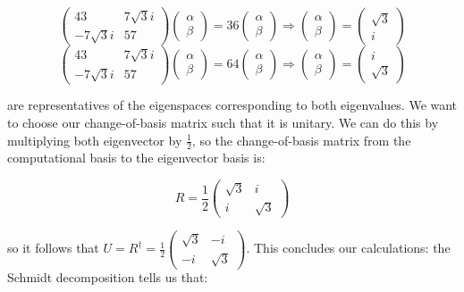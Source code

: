 \documentclass[
 10pt,
 amsmath,amssymb,
 notitlepage,
]{revtex4-1}
\begin{document}
$$ \begin{pmatrix} 43 & 7\sqrt{3}i \\ -7\sqrt{3}i & 57 \end{pmatrix} \begin{pmatrix} \alpha \\ \beta \end{pmatrix} = 36 \begin{pmatrix} \alpha \\ \beta \end{pmatrix} \Rightarrow \begin{pmatrix} \alpha \\ \beta \end{pmatrix} = \begin{pmatrix} \sqrt{3} \\ i \end{pmatrix}$$
$$ \begin{pmatrix} 43 & 7\sqrt{3}i \\ -7\sqrt{3}i & 57 \end{pmatrix} \begin{pmatrix} \alpha \\ \beta \end{pmatrix} = 64 \begin{pmatrix} \alpha \\ \beta \end{pmatrix} \Rightarrow \begin{pmatrix} \alpha \\ \beta \end{pmatrix} = \begin{pmatrix} i \\ \sqrt{3} \end{pmatrix}$$

are representatives of the eigenspaces corresponding to both eigenvalues. We want to choose our change-of-basis matrix such that it is unitary. We can do this by multiplying both eigenvector by $\frac{1}{2}$, so the change-of-basis matrix from the computational
basis to the eigenvector basis is:

$$R = \frac{1}{2} \begin{pmatrix} \sqrt{3} & i \\ i & \sqrt{3} \end{pmatrix}$$

so it follows that $U = R^{\dagger} = \frac{1}{2} \begin{pmatrix} \sqrt{3} & -i \\ -i & \sqrt{3} \end{pmatrix}$. This concludes our calculations: the Schmidt decomposition tells us that:
\end{document}
